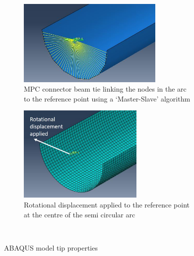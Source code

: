\begin{figure}
\begin{subfigure}{0.5\linewidth}
\centering
\includegraphics[width=7cm]{images/connectorMPCbeam.JPG}
\caption{MPC connector beam tie linking the nodes in the arc to the reference point using a `Master-Slave' algorithm}
\label{fig:sub3}
\end{subfigure}
\label{fig:test}
\begin{subfigure}{0.5\linewidth}
\centering
\includegraphics[width=6cm]{images/RP12.jpg}
\caption{Rotational displacement applied to the reference point at the centre of the semi circular arc}
\label{fig:sub3}
\end{subfigure}\\[1ex]
\caption{ABAQUS model tip properties}
\label{fig:test}
\end{figure}
